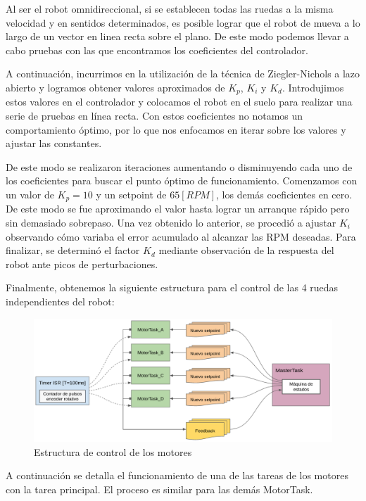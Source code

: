 Al ser el robot omnidireccional, si se establecen todas las ruedas a la misma velocidad y en sentidos determinados, es posible lograr que el robot de mueva a lo largo de un vector en linea recta sobre el plano. De este modo podemos llevar a cabo pruebas con las que encontramos los coeficientes del controlador.

A continuación, incurrimos en la utilización de la técnica de Ziegler-Nichols a lazo abierto y logramos obtener valores aproximados de $K_p$, $K_i$ y $K_d$. Introdujimos estos valores en el controlador y colocamos el robot en el suelo para realizar una serie de pruebas en línea recta. Con estos coeficientes no notamos un comportamiento óptimo, por lo que nos enfocamos en iterar sobre los valores y ajustar las constantes.

De este modo se realizaron iteraciones aumentando o disminuyendo cada uno de los coeficientes para buscar el punto óptimo de funcionamiento. Comenzamos con un valor de $K_p=10$ y un setpoint de $65[RPM]$, los demás coeficientes en cero. De este modo se fue aproximando el valor hasta lograr un arranque rápido pero sin demasiado sobrepaso. Una vez obtenido lo anterior, se procedió a ajustar $K_i$ observando cómo variaba el error acumulado al alcanzar las RPM deseadas. Para finalizar, se determinó el factor $K_d$ mediante observación de la respuesta del robot ante picos de perturbaciones.

Finalmente, obtenemos la siguiente estructura para el control de las 4 ruedas independientes del robot:

\begin{figure}[H]
    \centering
    \hspace*{-0.75cm}
    \includegraphics[width=1.05\linewidth]{images/diag_comp_esp32_pid_solo_todos_los_motores.png}
    \caption{Estructura de control de los motores}
    \label{fig:diagcommpesp32pidmotores}
\end{figure}

A continuación se detalla el funcionamiento de una de las tareas de los motores con la tarea principal. El proceso es similar para las demás MotorTask.

